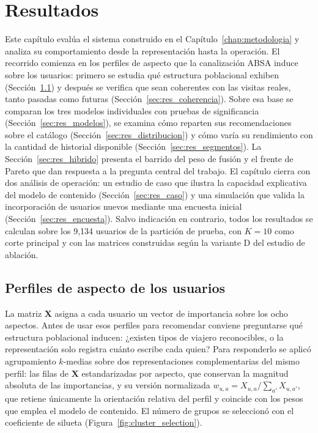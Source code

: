 \chapter{Resultados}\label{chap:resultados}

Este capítulo evalúa el sistema construido en el Capítulo~\ref{chap:metodologia} y analiza
su comportamiento desde la representación hasta la operación. El recorrido comienza en los
perfiles de aspecto que la canalización ABSA induce sobre los usuarios: primero se estudia
qué estructura poblacional exhiben (Sección~\ref{sec:res_perfiles}) y después se verifica
que sean coherentes con las visitas reales, tanto pasadas como futuras
(Sección~\ref{sec:res_coherencia}). Sobre esa base se comparan los tres modelos individuales
con pruebas de significancia (Sección~\ref{sec:res_modelos}), se examina cómo reparten sus
recomendaciones sobre el catálogo (Sección~\ref{sec:res_distribucion}) y cómo varía su
rendimiento con la cantidad de historial disponible (Sección~\ref{sec:res_segmentos}). La
Sección~\ref{sec:res_hibrido} presenta el barrido del peso de fusión y el frente de Pareto
que dan respuesta a la pregunta central del trabajo. El capítulo cierra con dos análisis de
operación: un estudio de caso que ilustra la capacidad explicativa del modelo de contenido
(Sección~\ref{sec:res_caso}) y una simulación que valida la incorporación de usuarios
nuevos mediante una encuesta inicial (Sección~\ref{sec:res_encuesta}). Salvo indicación en
contrario, todos los resultados se calculan sobre los 9,134 usuarios de la partición de
prueba, con $K=10$ como corte principal y con las matrices construidas según la variante D
del estudio de ablación.

\section{Perfiles de aspecto de los usuarios}\label{sec:res_perfiles}

La matriz $\mathbf{X}$ asigna a cada usuario un vector de importancia sobre los ocho
aspectos. Antes de usar esos perfiles para recomendar conviene preguntarse qué estructura
poblacional inducen: ¿existen tipos de viajero reconocibles, o la representación solo
registra cuánto escribe cada quien? Para responderlo se aplicó agrupamiento $k$-medias
sobre dos representaciones complementarias del mismo perfil: las filas de $\mathbf{X}$
estandarizadas por aspecto, que conservan la magnitud absoluta de las importancias, y su
versión normalizada $w_{u,a} = X_{u,a} / \sum_{a'} X_{u,a'}$, que retiene únicamente la
orientación relativa del perfil y coincide con los pesos que emplea el modelo de contenido.
El número de grupos se seleccionó con el coeficiente de silueta
(Figura~\ref{fig:cluster_selection}).


